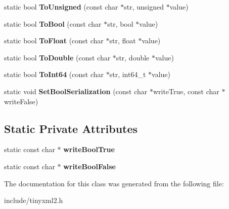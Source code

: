 \begin{DoxyCompactItemize}
\item 
\mbox{\label{classtinyxml2_1_1XMLUtil_a46f7e9542929001e726853ed8b571c07}} 
static bool {\bfseries To\+Unsigned} (const char $\ast$str, unsigned $\ast$value)
\item 
\mbox{\label{classtinyxml2_1_1XMLUtil_ae1692c644a807da2cd9e1e45f79a102f}} 
static bool {\bfseries To\+Bool} (const char $\ast$str, bool $\ast$value)
\item 
\mbox{\label{classtinyxml2_1_1XMLUtil_ac13b56b82e7f1d2d3954666b76c67d22}} 
static bool {\bfseries To\+Float} (const char $\ast$str, float $\ast$value)
\item 
\mbox{\label{classtinyxml2_1_1XMLUtil_a7e37ab30ba19c2b02042ab093172e9b8}} 
static bool {\bfseries To\+Double} (const char $\ast$str, double $\ast$value)
\item 
\mbox{\label{classtinyxml2_1_1XMLUtil_a8114c7289f19ee58129b2439584953e6}} 
static bool {\bfseries To\+Int64} (const char $\ast$str, int64\+\_\+t $\ast$value)
\item 
\mbox{\label{classtinyxml2_1_1XMLUtil_aa2c657802d96f8bc21af6ed33179d381}} 
static void {\bfseries Set\+Bool\+Serialization} (const char $\ast$write\+True, const char $\ast$write\+False)
\end{DoxyCompactItemize}
\subsection*{Static Private Attributes}
\begin{DoxyCompactItemize}
\item 
\mbox{\label{classtinyxml2_1_1XMLUtil_a5d173d121ea58f69d875f75cb108ef83}} 
static const char $\ast$ {\bfseries write\+Bool\+True}
\item 
\mbox{\label{classtinyxml2_1_1XMLUtil_ab642d65697daba2f49a1f0d83411ffa5}} 
static const char $\ast$ {\bfseries write\+Bool\+False}
\end{DoxyCompactItemize}


The documentation for this class was generated from the following file\+:\begin{DoxyCompactItemize}
\item 
include/tinyxml2.\+h\end{DoxyCompactItemize}

